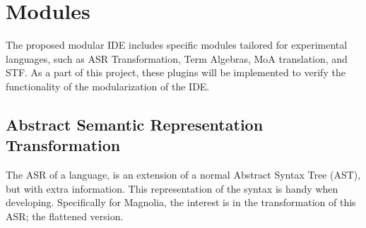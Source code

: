 \section{Modules}

The proposed modular IDE includes specific modules tailored for experimental
languages, such as ASR Transformation, Term Algebras, MoA translation, and STF.
As a part of this project, these plugins will be implemented to verify the
functionality of the modularization of the IDE.

\subsection{Abstract Semantic Representation Transformation}

The ASR of a language, is an extension of a normal Abstract Syntax Tree (AST),
but with extra information. This representation of the syntax is handy when
developing. Specifically for Magnolia, the interest is in the transformation of
this ASR; the flattened version.
